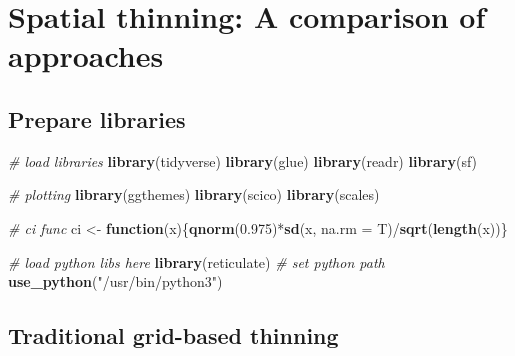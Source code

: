 \documentclass[]{article}
\newenvironment{Shaded}{}{}
\newcommand{\CommentTok}[1]{\textcolor[rgb]{0.38,0.63,0.69}{\textit{#1}}}
\newcommand{\ControlFlowTok}[1]{\textcolor[rgb]{0.00,0.44,0.13}{\textbf{#1}}}
\newcommand{\DataTypeTok}[1]{\textcolor[rgb]{0.56,0.13,0.00}{#1}}
\newcommand{\FloatTok}[1]{\textcolor[rgb]{0.25,0.63,0.44}{#1}}
\newcommand{\KeywordTok}[1]{\textcolor[rgb]{0.00,0.44,0.13}{\textbf{#1}}}
\newcommand{\NormalTok}[1]{#1}
\newcommand{\OperatorTok}[1]{\textcolor[rgb]{0.40,0.40,0.40}{#1}}
\newcommand{\StringTok}[1]{\textcolor[rgb]{0.25,0.44,0.63}{#1}}
\begin{document}
\hypertarget{spatial-thinning-a-comparison-of-approaches}{%
\section{Spatial thinning: A comparison of approaches}\label{spatial-thinning-a-comparison-of-approaches}}

\hypertarget{prepare-libraries-5}{%
\subsection{Prepare libraries}\label{prepare-libraries-5}}

\begin{Shaded}
\begin{Highlighting}[]
\CommentTok{# load libraries}
\KeywordTok{library}\NormalTok{(tidyverse)}
\KeywordTok{library}\NormalTok{(glue)}
\KeywordTok{library}\NormalTok{(readr)}
\KeywordTok{library}\NormalTok{(sf)}

\CommentTok{# plotting}
\KeywordTok{library}\NormalTok{(ggthemes)}
\KeywordTok{library}\NormalTok{(scico)}
\KeywordTok{library}\NormalTok{(scales)}

\CommentTok{# ci func}
\NormalTok{ci <-}\StringTok{ }\ControlFlowTok{function}\NormalTok{(x)\{}\KeywordTok{qnorm}\NormalTok{(}\FloatTok{0.975}\NormalTok{)}\OperatorTok{*}\KeywordTok{sd}\NormalTok{(x, }\DataTypeTok{na.rm =}\NormalTok{ T)}\OperatorTok{/}\KeywordTok{sqrt}\NormalTok{(}\KeywordTok{length}\NormalTok{(x))\}}

\CommentTok{# load python libs here}
\KeywordTok{library}\NormalTok{(reticulate)}
\CommentTok{# set python path}
\KeywordTok{use_python}\NormalTok{(}\StringTok{"/usr/bin/python3"}\NormalTok{)}
\end{Highlighting}
\end{Shaded}

\hypertarget{traditional-grid-based-thinning}{%
\subsection{Traditional grid-based thinning}\label{traditional-grid-based-thinning}}
\end{document}
